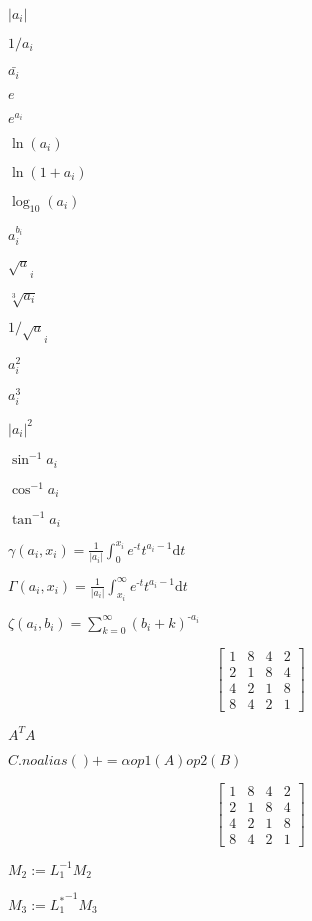 \documentclass{article}
\begin{document}
$ |a_i| $
\pagebreak

$ 1/a_i $
\pagebreak

$ \bar{a_i} $
\pagebreak

$ e $
\pagebreak

$ e^{a_i} $
\pagebreak

$ \ln({a_i}) $
\pagebreak

$ \ln({1+a_i}) $
\pagebreak

$ \log_{10}({a_i}) $
\pagebreak

$ a_i ^ {b_i} $
\pagebreak

$ \sqrt a_i $
\pagebreak

$ \sqrt[3]{ a_i }$
\pagebreak

$ 1/{\sqrt a_i} $
\pagebreak

$ a_i^2 $
\pagebreak

$ a_i^3 $
\pagebreak

$ |a_i|^2 $
\pagebreak

$ \sin^{-1} a_i $
\pagebreak

$ \cos^{-1} a_i $
\pagebreak

$ \tan^{-1} a_i $
\pagebreak

$ \gamma(a_i,x_i)= \frac{1}{|a_i|} \int_{0}^{x_i}e^{\text{-}t} t^{a_i-1} \mathrm{d} t $
\pagebreak

$ \Gamma(a_i,x_i) = \frac{1}{|a_i|} \int_{x_i}^{\infty}e^{\text{-}t} t^{a_i-1} \mathrm{d} t $
\pagebreak

$ \zeta(a_i,b_i)=\sum_{k=0}^{\infty}(b_i+k)^{\text{-}a_i} $
\pagebreak

\[ \begin{bmatrix}
    1 & 8 & 4 & 2 \\
    2 & 1 & 8 & 4 \\
    4 & 2 & 1 & 8 \\
    8 & 4 & 2 & 1
\end{bmatrix} \]
\pagebreak

$ A^T A $
\pagebreak

$ C.noalias() += \alpha op1(A) op2(B) $
\pagebreak

\[ \begin{bmatrix} 
    1 & 8 & 4 & 2 \\ 
    2 & 1 & 8 & 4 \\
    4 & 2 & 1 & 8 \\
    8 & 4 & 2 & 1
\end{bmatrix} \]
\pagebreak

$ M_2 := L_1^{-1} M_2 $
\pagebreak

$ M_3 := {L_1^*}^{-1} M_3 $
\pagebreak
\end{document}
